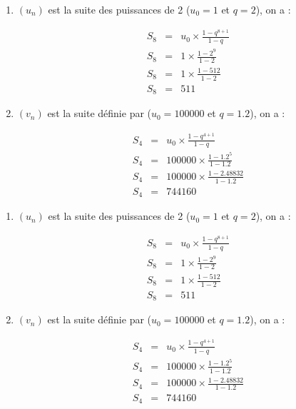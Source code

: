 \documentclass[12pt,a4paper]{article}
\date{}
\title{}
\begin{document}




%
\begin{myexs}
	\begin{enumerate}
		\item $(u_n)$ est la suite des puissances de 2 ($u_0 = 1$ et $q = 2$), on a :
		
		\begin{eqnarray*}
			S_8 &=& u_0 \times \frac{1 - q^{8+1}}{1 - q} \\
			S_8 &=& 1 \times \frac{1 - 2^9}{1 - 2} \\
			S_8 &=& 1 \times \frac{1 - 512}{1 - 2} \\
			S_8 &=& 511
		\end{eqnarray*} 
		
		\item $(v_n)$ est la suite définie par ($u_0 = \num{100000}$ et $q = \num{1.2}$), on a :
		
		\begin{eqnarray*}
			S_4 &=& u_0 \times \frac{1 - q^{4+1}}{1 - q} \\
			S_4 &=& \num{100000} \times \frac{1 - \num{1.2}^5}{1 - \num{1.2}} \\
			S_4 &=& \num{100000} \times \frac{1 - \num{2.48832}}{1 - \num{1.2}} \\
			S_4 &=& \num{744160}
		\end{eqnarray*} 
	\end{enumerate}
\end{myexs}

\vspace*{-0.4cm}

\begin{myexs}
	\begin{enumerate}
		\item $(u_n)$ est la suite des puissances de 2 ($u_0 = 1$ et $q = 2$), on a :
		
		\begin{eqnarray*}
			S_8 &=& u_0 \times \frac{1 - q^{8+1}}{1 - q} \\
			S_8 &=& 1 \times \frac{1 - 2^9}{1 - 2} \\
			S_8 &=& 1 \times \frac{1 - 512}{1 - 2} \\
			S_8 &=& 511
		\end{eqnarray*} 
		
		\item $(v_n)$ est la suite définie par ($u_0 = \num{100000}$ et $q = \num{1.2}$), on a :
		
		\begin{eqnarray*}
			S_4 &=& u_0 \times \frac{1 - q^{4+1}}{1 - q} \\
			S_4 &=& \num{100000} \times \frac{1 - \num{1.2}^5}{1 - \num{1.2}} \\
			S_4 &=& \num{100000} \times \frac{1 - \num{2.48832}}{1 - \num{1.2}} \\
			S_4 &=& \num{744160}
		\end{eqnarray*} 
	\end{enumerate}
\end{myexs}



	
\end{document}
